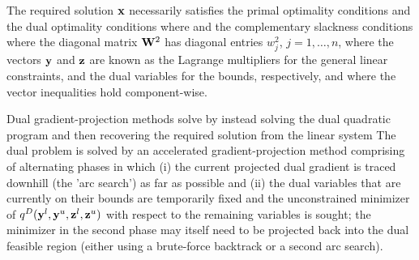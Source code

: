 \documentclass{galahad}
\begin{document}
\galmethod
The required solution ${\mathbf{x}}$ necessarily satisfies
the primal optimality conditions
and
the dual optimality conditions
where
and the complementary slackness conditions
where the diagonal matrix ${\mathbf{W}}^{2}$ has diagonal entries $w_{j}^{2}$,
$j = 1, \ldots , n$, where the vectors ${\mathbf{y}}$ and ${\mathbf{z}}$ are
known as the Lagrange multipliers for
the general linear constraints, and the dual variables for the bounds,
respectively, and where the vector inequalities hold component-wise.

Dual gradient-projection methods solve  by instead solving the
dual quadratic program
and then recovering the required solution from the linear system
The dual problem  is solved by an accelerated gradient-projection
method comprising of alternating phases in which (i) the current
projected dual gradient is traced downhill (the 'arc search')
as far as possible and (ii) the  dual variables that
are currently on their bounds are temporarily fixed and the unconstrained
minimizer of $q^D({\mathbf{y}}^{l}, {\mathbf{y}}^{u}, {\mathbf{z}}^{l}, {\mathbf{z}}^{u})$ with respect to the
remaining variables is sought; the minimizer in the second phase may itself
need to be projected back into the dual feasible region (either
using a brute-force backtrack or a second arc search).
\end{document}
